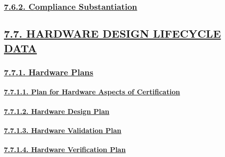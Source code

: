 \documentclass[
]{article}
\begin{document}
\hypertarget{compliance-substantiation}{%
\subsubsection{\texorpdfstring{\protect\hyperlink{compliance-substantiation-1}{7.6.2.
Compliance
Substantiation}}{7.6.2. Compliance Substantiation}}\label{compliance-substantiation}}

\hypertarget{hardware-design-lifecycle-data}{%
\subsection{\texorpdfstring{\protect\hyperlink{hardware-design-lifecycle-data-1}{7.7.
HARDWARE DESIGN LIFECYCLE
DATA}}{7.7. HARDWARE DESIGN LIFECYCLE DATA}}\label{hardware-design-lifecycle-data}}

\hypertarget{hardware-plans}{%
\subsubsection{\texorpdfstring{\protect\hyperlink{hardware-plans-1}{7.7.1.
Hardware Plans}}{7.7.1. Hardware Plans}}\label{hardware-plans}}

\hypertarget{plan-for-hardware-aspects-of-certification}{%
\paragraph{\texorpdfstring{\protect\hyperlink{plan-for-hardware-aspects-of-certification-1}{7.7.1.1.
Plan for Hardware Aspects of
Certification}}{7.7.1.1. Plan for Hardware Aspects of Certification}}\label{plan-for-hardware-aspects-of-certification}}

\hypertarget{hardware-design-plan}{%
\paragraph{\texorpdfstring{\protect\hyperlink{hardware-design-plan-1}{7.7.1.2.
Hardware Design
Plan}}{7.7.1.2. Hardware Design Plan}}\label{hardware-design-plan}}

\hypertarget{hardware-validation-plan}{%
\paragraph{\texorpdfstring{\protect\hyperlink{hardware-validation-plan-1}{7.7.1.3.
Hardware Validation
Plan}}{7.7.1.3. Hardware Validation Plan}}\label{hardware-validation-plan}}

\hypertarget{hardware-verification-plan}{%
\paragraph{\texorpdfstring{\protect\hyperlink{hardware-verification-plan-1}{7.7.1.4.
Hardware Verification
Plan}}{7.7.1.4. Hardware Verification Plan}}\label{hardware-verification-plan}}
\end{document}
